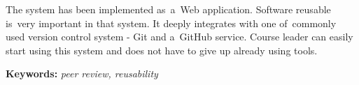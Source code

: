 The system has been implemented as~a~Web application. Software reusable is~very important in that system. It deeply integrates with one of~commonly used version control system - Git and a~GitHub service. Course leader can easily start using this system and does not have to give up already using tools.

\vspace*{\baselineskip}

\noindent\textbf{Keywords:} \textit{peer review, reusability}


